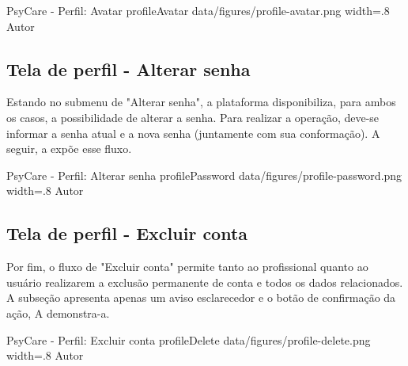 \image
    {PsyCare - Perfil: Avatar}
    {profileAvatar}
    {data/figures/profile-avatar.png}
    {width=.8\textwidth}
    {Autor}

\subsection{Tela de perfil - Alterar senha}
\label{sec:perfilAvatar}
Estando no submenu de "Alterar senha", a plataforma disponibiliza, para ambos os casos, a possibilidade de alterar a senha. Para realizar a operação, deve-se informar a senha atual e a nova senha (juntamente com sua conformação). A seguir, a  expõe esse fluxo.

\image
    {PsyCare - Perfil: Alterar senha}
    {profilePassword}
    {data/figures/profile-password.png}
    {width=.8\textwidth}
    {Autor}

\subsection{Tela de perfil - Excluir conta}
\label{sec:perfilAvatar}
Por fim, o fluxo de "Excluir conta" permite tanto ao profissional quanto ao usuário realizarem a exclusão permanente de conta e todos os dados relacionados. A subseção apresenta apenas um aviso esclarecedor e o botão de confirmação da ação, A  demonstra-a.

\image
    {PsyCare - Perfil: Excluir conta}
    {profileDelete}
    {data/figures/profile-delete.png}
    {width=.8\textwidth}
    {Autor}